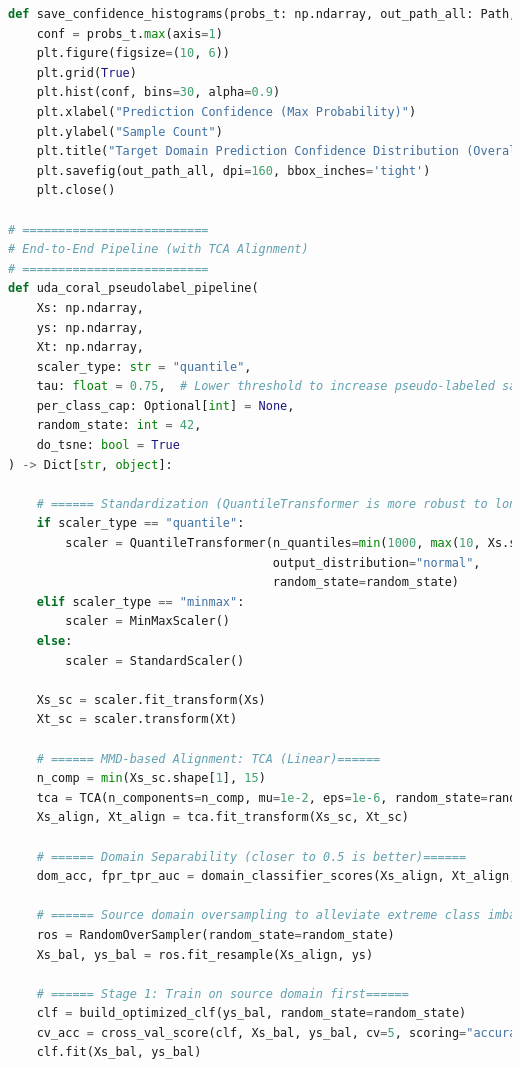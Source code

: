 \documentclass[a4paper]{CPIPC}
\numberwithin{equation}{section}
\begin{document}
\begin{lstlisting}[language=Python, caption=Random Forest Classifier]
def save_confidence_histograms(probs_t: np.ndarray, out_path_all: Path, out_dir_per_class: Path):
    conf = probs_t.max(axis=1)
    plt.figure(figsize=(10, 6))
    plt.grid(True)
    plt.hist(conf, bins=30, alpha=0.9)
    plt.xlabel("Prediction Confidence (Max Probability)")
    plt.ylabel("Sample Count")
    plt.title("Target Domain Prediction Confidence Distribution (Overall)")
    plt.savefig(out_path_all, dpi=160, bbox_inches='tight')
    plt.close()

# ==========================
# End-to-End Pipeline (with TCA Alignment)
# ==========================
def uda_coral_pseudolabel_pipeline(
    Xs: np.ndarray,
    ys: np.ndarray,
    Xt: np.ndarray,
    scaler_type: str = "quantile",
    tau: float = 0.75,  # Lower threshold to increase pseudo-labeled samples
    per_class_cap: Optional[int] = None,
    random_state: int = 42,
    do_tsne: bool = True
) -> Dict[str, object]:

    # ====== Standardization (QuantileTransformer is more robust to long-tailed distributions)======
    if scaler_type == "quantile":
        scaler = QuantileTransformer(n_quantiles=min(1000, max(10, Xs.shape[0] // 2)),
                                     output_distribution="normal",
                                     random_state=random_state)
    elif scaler_type == "minmax":
        scaler = MinMaxScaler()
    else:
        scaler = StandardScaler()

    Xs_sc = scaler.fit_transform(Xs)
    Xt_sc = scaler.transform(Xt)

    # ====== MMD-based Alignment: TCA (Linear)======
    n_comp = min(Xs_sc.shape[1], 15)
    tca = TCA(n_components=n_comp, mu=1e-2, eps=1e-6, random_state=random_state)
    Xs_align, Xt_align = tca.fit_transform(Xs_sc, Xt_sc)

    # ====== Domain Separability (closer to 0.5 is better)======
    dom_acc, fpr_tpr_auc = domain_classifier_scores(Xs_align, Xt_align, random_state=random_state)

    # ====== Source domain oversampling to alleviate extreme class imbalance (avoiding SMOTE to prevent small classes from collapsing)======
    ros = RandomOverSampler(random_state=random_state)
    Xs_bal, ys_bal = ros.fit_resample(Xs_align, ys)

    # ====== Stage 1: Train on source domain first======
    clf = build_optimized_clf(ys_bal, random_state=random_state)
    cv_acc = cross_val_score(clf, Xs_bal, ys_bal, cv=5, scoring="accuracy").mean()
    clf.fit(Xs_bal, ys_bal)


\end{lstlisting}
\end{document}
